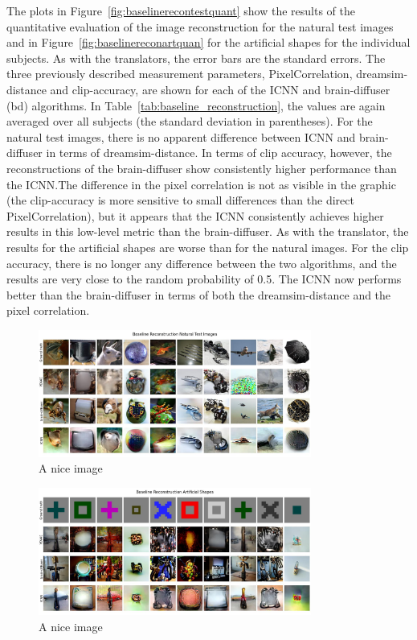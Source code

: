 The plots in Figure~\ref{fig:baselinerecontestquant} show the results of the quantitative evaluation of the image reconstruction for the natural test images and in Figure~\ref{fig:baselinereconartquan} for the artificial shapes for the individual subjects. As with the translators, the error bars are the standard errors. The three previously described measurement parameters, PixelCorrelation, dreamsim-distance and clip-accuracy, are shown for each of the ICNN and brain-diffuser (bd) algorithms. In Table~\ref{tab:baseline_reconstruction}, the values are again averaged over all subjects (the standard deviation in parentheses). For the natural test images, there is no apparent difference between ICNN and brain-diffuser in terms of dreamsim-distance. In terms of clip accuracy, however, the reconstructions of the brain-diffuser show consistently higher performance than the ICNN.\@ The difference in the pixel correlation is not as visible in the graphic (the clip-accuracy is more sensitive to small differences than the direct PixelCorrelation), but it appears that the ICNN consistently achieves higher results in this low-level metric than the brain-diffuser. As with the translator, the results for the artificial shapes are worse than for the natural images. For the clip accuracy, there is no longer any difference between the two algorithms, and the results are very close to the random probability of 0.5. The ICNN now performs better than the brain-diffuser in terms of both the dreamsim-distance and the pixel correlation. 


\begin{figure}[ht]
    \centering
    \includegraphics[width=0.8\textwidth]{plots/baseline_qual_recon_test.JPEG}
    \caption{A nice image}\label{fig:baselinerecontestqual}
\end{figure}

\begin{figure}[ht]
    \centering
    \includegraphics[width=0.8\textwidth]{plots/baseline_qual_recon_art.JPEG}
    \caption{A nice image}\label{fig:baselinereconartqual}
\end{figure}


